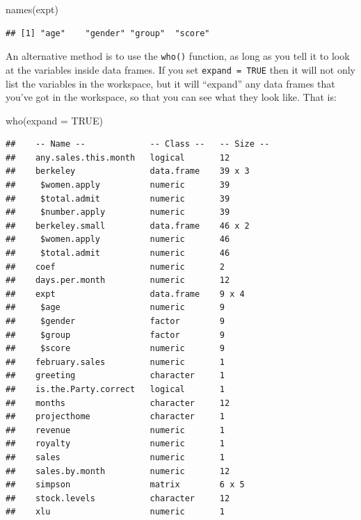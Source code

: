 \documentclass[
]{book}
\newenvironment{Shaded}{\begin{snugshade}}{\end{snugshade}}
\newcommand{\AttributeTok}[1]{\textcolor[rgb]{0.77,0.63,0.00}{#1}}
\newcommand{\ConstantTok}[1]{\textcolor[rgb]{0.00,0.00,0.00}{#1}}
\newcommand{\FunctionTok}[1]{\textcolor[rgb]{0.00,0.00,0.00}{#1}}
\newcommand{\NormalTok}[1]{#1}
\begin{document}
\begin{Shaded}
\begin{Highlighting}[]
\FunctionTok{names}\NormalTok{(expt)}
\end{Highlighting}
\end{Shaded}

\begin{verbatim}
## [1] "age"    "gender" "group"  "score"
\end{verbatim}

An alternative method is to use the \texttt{who()} function, as long as you tell it to look at the variables inside data frames. If you set \texttt{expand\ =\ TRUE} then it will not only list the variables in the workspace, but it will ``expand'' any data frames that you've got in the workspace, so that you can see what they look like. That is:

\begin{Shaded}
\begin{Highlighting}[]
\FunctionTok{who}\NormalTok{(}\AttributeTok{expand =} \ConstantTok{TRUE}\NormalTok{)}
\end{Highlighting}
\end{Shaded}

\begin{verbatim}
##    -- Name --             -- Class --   -- Size --
##    any.sales.this.month   logical       12        
##    berkeley               data.frame    39 x 3    
##     $women.apply          numeric       39        
##     $total.admit          numeric       39        
##     $number.apply         numeric       39        
##    berkeley.small         data.frame    46 x 2    
##     $women.apply          numeric       46        
##     $total.admit          numeric       46        
##    coef                   numeric       2         
##    days.per.month         numeric       12        
##    expt                   data.frame    9 x 4     
##     $age                  numeric       9         
##     $gender               factor        9         
##     $group                factor        9         
##     $score                numeric       9         
##    february.sales         numeric       1         
##    greeting               character     1         
##    is.the.Party.correct   logical       1         
##    months                 character     12        
##    projecthome            character     1         
##    revenue                numeric       1         
##    royalty                numeric       1         
##    sales                  numeric       1         
##    sales.by.month         numeric       12        
##    simpson                matrix        6 x 5     
##    stock.levels           character     12        
##    xlu                    numeric       1
\end{verbatim}
\end{document}
